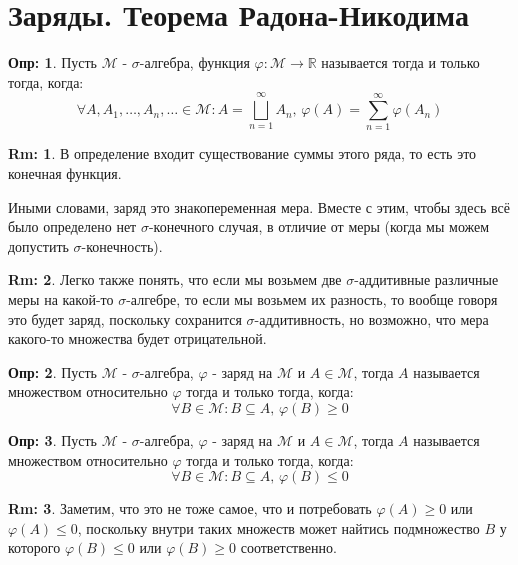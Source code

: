 \documentclass[12pt]{article}
\newcommand{\MR}{\mathbb{R}}
\newcommand{\MM}{\mathcal{M}}
\theoremstyle{definition}
\newtheorem{defn}{Опр:}
\newtheorem{rem}{Rm:}
\newcommand{\ddsum}[2]{\displaystyle\sum\limits_{#1}^{#2}}
\begin{document}
\section*{Заряды. Теорема Радона-Никодима}

\begin{defn}
	Пусть $\MM$ - $\sigma$-алгебра, функция $\varphi \colon \MM \to \MR$ называется  тогда и только тогда, когда:
	$$
		\forall A, A_1, \dotsc, A_n, \dotsc \in \MM \colon A = \bigsqcup\limits_{n = 1}^{\infty}A_n, \, \varphi(A) = \ddsum{n = 1}{\infty}\varphi(A_n)
	$$
\end{defn}
\begin{rem}
	В определение входит существование суммы этого ряда, то есть это конечная функция.
\end{rem}

Иными словами, заряд это знакопеременная мера. Вместе с этим, чтобы здесь всё было определено нет $\sigma$-конечного случая, в отличие от меры (когда мы можем допустить $\sigma$-конечность).

\begin{rem}
	Легко также понять, что если мы возьмем две $\sigma$-аддитивные различные меры на какой-то $\sigma$-алгебре, то если мы возьмем их разность, то вообще говоря это будет заряд, поскольку сохранится $\sigma$-аддитивность, но возможно, что мера какого-то множества будет отрицательной.
\end{rem}

\begin{defn}
	Пусть $\MM$ - $\sigma$-алгебра, $\varphi$ - заряд на $\MM$ и $A \in \MM$, тогда $A$ называется  множеством относительно $\varphi$ тогда и только тогда, когда:
	$$
		\forall B \in \MM \colon B \subseteq A, \, \varphi(B) \geq 0
	$$
\end{defn}
\begin{defn}
	Пусть $\MM$ - $\sigma$-алгебра, $\varphi$ - заряд на $\MM$ и $A \in \MM$, тогда $A$ называется  множеством относительно $\varphi$ тогда и только тогда, когда:
	$$
		\forall B \in \MM \colon B \subseteq A, \,  \varphi(B) \leq 0
	$$
\end{defn}
\begin{rem}
	Заметим, что это не тоже самое, что и потребовать $\varphi(A) \geq 0$ или $\varphi(A) \leq 0$, поскольку внутри таких множеств может найтись подмножество $B$ у которого $\varphi(B) \leq  0$ или $\varphi(B) \geq 0$ соответственно.
\end{rem}
\end{document}
